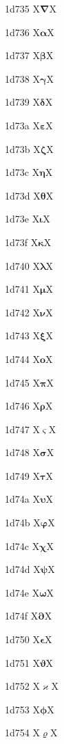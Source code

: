 \documentclass[11pt]{article}
\begin{document}
1d735 X{\ensuremath{\boldsymbol{\nabla}}}X

1d736 X{\ensuremath{\boldsymbol{\alpha}}}X

1d737 X{\ensuremath{\boldsymbol{\beta}}}X

1d738 X{\ensuremath{\boldsymbol{\gamma}}}X

1d739 X{\ensuremath{\boldsymbol{\delta}}}X

1d73a X{\ensuremath{\boldsymbol{\varepsilon}}}X

1d73b X{\ensuremath{\boldsymbol{\zeta}}}X

1d73c X{\ensuremath{\boldsymbol{\eta}}}X

1d73d X{\ensuremath{\boldsymbol{\theta}}}X

1d73e X{\ensuremath{\boldsymbol{\iota}}}X

1d73f X{\ensuremath{\boldsymbol{\kappa}}}X

1d740 X{\ensuremath{\boldsymbol{\lambda}}}X

1d741 X{\ensuremath{\boldsymbol{\mu}}}X

1d742 X{\ensuremath{\boldsymbol{\nu}}}X

1d743 X{\ensuremath{\boldsymbol{\xi}}}X

1d744 X{\ensuremath{\boldsymbol{o}}}X

1d745 X{\ensuremath{\boldsymbol{\pi}}}X

1d746 X{\ensuremath{\boldsymbol{\rho}}}X

1d747 X{\ensuremath{\boldsymbol{\varsigma}}}X

1d748 X{\ensuremath{\boldsymbol{\sigma}}}X

1d749 X{\ensuremath{\boldsymbol{\tau}}}X

1d74a X{\ensuremath{\boldsymbol{\upsilon}}}X

1d74b X{\ensuremath{\boldsymbol{\varphi}}}X

1d74c X{\ensuremath{\boldsymbol{\chi}}}X

1d74d X{\ensuremath{\boldsymbol{\psi}}}X

1d74e X{\ensuremath{\boldsymbol{\omega}}}X

1d74f X{\ensuremath{\boldsymbol{\partial}}}X

1d750 X{\ensuremath{\boldsymbol{\epsilon}}}X

1d751 X{\ensuremath{\boldsymbol{\vartheta}}}X

1d752 X{\ensuremath{\boldsymbol{\varkappa}}}X

1d753 X{\ensuremath{\boldsymbol{\phi}}}X

1d754 X{\ensuremath{\boldsymbol{\varrho}}}X
\end{document}
